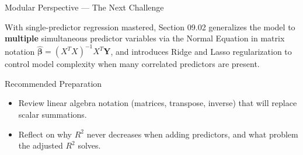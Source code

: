 \documentclass[10pt, aspectratio=169]{beamer}
\begin{document}
\begin{frame}{Modular Perspective --- The Next Challenge}
  \scriptsize
  \begin{retoclase}
    With single-predictor regression mastered, Section 09.02 generalizes the model to \textbf{multiple} simultaneous predictor variables via the Normal Equation in matrix notation $\hat{\boldsymbol\beta}=(X^TX)^{-1}X^T\mathbf{Y}$, and introduces Ridge and Lasso regularization to control model complexity when many correlated predictors are present.
  \end{retoclase}

  \vspace{0.08cm}
  \pause
  \begin{alertblock}{Recommended Preparation}
    \begin{itemize}\itemsep=0.06cm
      \item Review linear algebra notation (matrices, transpose, inverse) that will replace scalar summations.
      \item Reflect on why $R^2$ never decreases when adding predictors, and what problem the adjusted $R^2$ solves.
    \end{itemize}
  \end{alertblock}
\end{frame}
\end{document}
